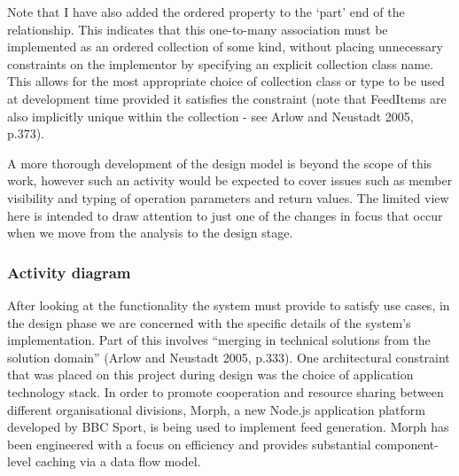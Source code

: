 \documentclass[a4paper]{article}
\begin{document}
Note that I have also added the \textsf{ordered} property to the `part' end of the relationship. This indicates that this one-to-many association must be implemented as an ordered collection of some kind, without placing unnecessary constraints on the implementor by specifying an explicit collection class name. This allows for the most appropriate choice of collection class or type to be used at development time provided it satisfies the constraint (note that \textsf{FeedItem}s are also implicitly unique within the collection - see Arlow and Neustadt 2005, p.373).

A more thorough development of the design model is beyond the scope of this work, however such an activity would be expected to cover issues such as member visibility and typing of operation parameters and return values. The limited view here is intended to draw attention to just one of the changes in focus that occur when we move from the analysis to the design stage.

\subsubsection{Activity diagram}

After looking at the functionality the system must provide to satisfy use cases, in the design phase we are concerned with the specific details of the system's implementation. Part of this involves ``merging in technical solutions from the solution domain'' (Arlow and Neustadt 2005, p.333). One architectural constraint that was placed on this project during design was the choice of application technology stack. In order to promote cooperation and resource sharing between different organisational divisions, Morph, a new Node.js application platform developed by BBC Sport, is being used to implement feed generation. Morph has been engineered with a focus on efficiency and provides substantial component-level caching via a data flow model.
\end{document}
